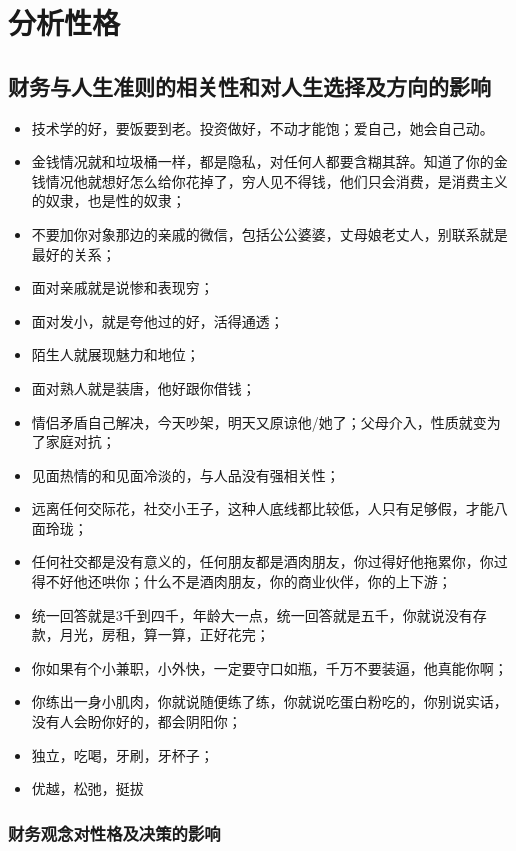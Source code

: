 \documentclass{book}
\begin{document}
\tableofcontents
\clearpage

\chapter{分析性格}

\section{财务与人生准则的相关性和对人生选择及方向的影响}

\begin{itemize}
    \item 技术学的好，要饭要到老。投资做好，不动才能饱；爱自己，她会自己动。
    \item 金钱情况就和垃圾桶一样，都是隐私，对任何人都要含糊其辞。知道了你的金钱情况他就想好怎么给你花掉了，穷人见不得钱，他们只会消费，是消费主义的奴隶，也是性的奴隶；
    \item 不要加你对象那边的亲戚的微信，包括公公婆婆，丈母娘老丈人，别联系就是最好的关系；
    \item 面对亲戚就是说惨和表现穷；
    \item 面对发小，就是夸他过的好，活得通透；
    \item 陌生人就展现魅力和地位；
    \item 面对熟人就是装唐，他好跟你借钱；
    \item 情侣矛盾自己解决，今天吵架，明天又原谅他/她了；父母介入，性质就变为了家庭对抗；
    \item 见面热情的和见面冷淡的，与人品没有强相关性；
    \item 远离任何交际花，社交小王子，这种人底线都比较低，人只有足够假，才能八面玲珑；
    \item 任何社交都是没有意义的，任何朋友都是酒肉朋友，你过得好他拖累你，你过得不好他还哄你；什么不是酒肉朋友，你的商业伙伴，你的上下游；
    \item 统一回答就是3千到四千，年龄大一点，统一回答就是五千，你就说没有存款，月光，房租，算一算，正好花完；
    \item 你如果有个小兼职，小外快，一定要守口如瓶，千万不要装逼，他真能你啊；
    \item 你练出一身小肌肉，你就说随便练了练，你就说吃蛋白粉吃的，你别说实话，没有人会盼你好的，都会阴阳你；
    \item 独立，吃喝，牙刷，牙杯子；
    \item 优越，松弛，挺拔
\end{itemize}

\subsection{财务观念对性格及决策的影响}
\end{document}
